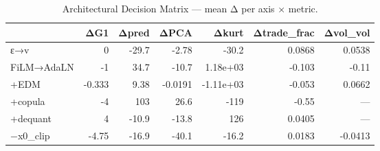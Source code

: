 \begin{table}
\caption{Architectural Decision Matrix — mean Δ per axis × metric.}
\label{tab:decision_matrix}
\begin{tabular}{lrrrrrr}
\toprule
 & ΔG1 & Δpred & ΔPCA & Δkurt & Δtrade_frac & Δvol_vol \\
\midrule
ε→v & 0 & -29.7 & -2.78 & -30.2 & 0.0868 & 0.0538 \\
FiLM→AdaLN & -1 & 34.7 & -10.7 & 1.18e+03 & -0.103 & -0.11 \\
+EDM & -0.333 & 9.38 & -0.0191 & -1.11e+03 & -0.053 & 0.0662 \\
+copula & -4 & 103 & 26.6 & -119 & -0.55 & — \\
+dequant & 4 & -10.9 & -13.8 & 126 & 0.0405 & — \\
−x0_clip & -4.75 & -16.9 & -40.1 & -16.2 & 0.0183 & -0.0413 \\
\bottomrule
\end{tabular}
\end{table}
